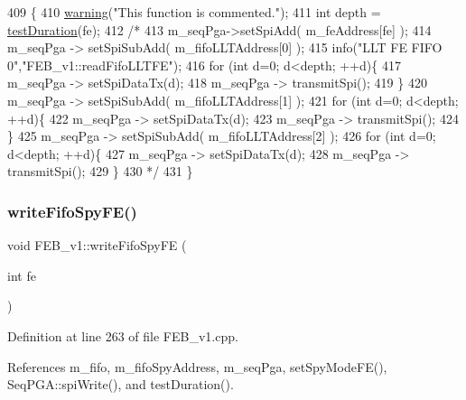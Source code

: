 \begin{DoxyCode}
409                                   \{
410   \hyperlink{classObject_a65cd4fda577711660821fd2cd5a3b4c9}{warning}(\textcolor{stringliteral}{"This function is commented."});
411   \textcolor{keywordtype}{int} depth = \hyperlink{classFEB__v1_a7f1db8ca9490172fce7603da9e703dec}{testDuration}(fe);
412   \textcolor{comment}{/*}
413 \textcolor{comment}{  m\_seqPga->setSpiAdd( m\_feAddress[fe] );}
414 \textcolor{comment}{  m\_seqPga -> setSpiSubAdd( m\_fifoLLTAddress[0] );  }
415 \textcolor{comment}{  info("LLT FE FIFO 0","FEB\_v1::readFifoLLTFE");        }
416 \textcolor{comment}{  for (int d=0; d<depth; ++d)\{ }
417 \textcolor{comment}{    m\_seqPga -> setSpiDataTx(d);}
418 \textcolor{comment}{    m\_seqPga -> transmitSpi();}
419 \textcolor{comment}{  \}}
420 \textcolor{comment}{  m\_seqPga -> setSpiSubAdd( m\_fifoLLTAddress[1] );}
421 \textcolor{comment}{  for (int d=0; d<depth; ++d)\{ }
422 \textcolor{comment}{    m\_seqPga -> setSpiDataTx(d);}
423 \textcolor{comment}{    m\_seqPga -> transmitSpi();}
424 \textcolor{comment}{  \}}
425 \textcolor{comment}{  m\_seqPga -> setSpiSubAdd( m\_fifoLLTAddress[2] );}
426 \textcolor{comment}{  for (int d=0; d<depth; ++d)\{ }
427 \textcolor{comment}{    m\_seqPga -> setSpiDataTx(d);}
428 \textcolor{comment}{    m\_seqPga -> transmitSpi();}
429 \textcolor{comment}{    \}}
430 \textcolor{comment}{*/}
431 \}
\end{DoxyCode}
\mbox{\label{classFEB__v1_a0fd77cbaae9ae853e5c4dfc81b4462a5}} 
\subsubsection{\texorpdfstring{write\+Fifo\+Spy\+F\+E()}{writeFifoSpyFE()}}
{\footnotesize\ttfamily void F\+E\+B\+\_\+v1\+::write\+Fifo\+Spy\+FE (\begin{DoxyParamCaption}\item[{int}]{fe }\end{DoxyParamCaption})}



Definition at line 263 of file F\+E\+B\+\_\+v1.\+cpp.



References m\+\_\+fifo, m\+\_\+fifo\+Spy\+Address, m\+\_\+seq\+Pga, set\+Spy\+Mode\+F\+E(), Seq\+P\+G\+A\+::spi\+Write(), and test\+Duration().



